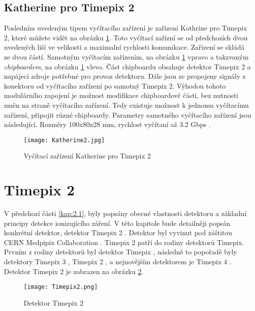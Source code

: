 \subsection{Katherine pro Timepix 2} %
Posledním uvedeným tipem vyčítacího zařízení je zařízení Kathrine pro Timepix 2, které můžete vidět na obrázku \ref{fig:Katherine2}. Toto vyčítací zařízní se od předchozích dvou uvedených liší ve velikosti a maximalní rychlosti komunikace. Zařízení se skládá ze dvou částí. Samotným vyčítacím zařízením, na obrázku \ref{fig:Katherine2} vpravo a takzvaným \textit{chipboardem}, na obrázku \ref{fig:Katherine2} vlevo. Část chipboardu obsahuje detektor Timepix 2 a napájecí zdroje potřebné pro provoz detektoru. Dále jsou ze propojeny signály z konektoru od vyčítacího zařízení po samotný Timepix 2. Výhodou tohoto modulárního zapojení je možnost modifikace chipboardové části, bez nutnosti změn na straně vyčítacího zařízení. Tedy existuje možnost k jednomu vyčítacímu zařízení, připojit různé chipboardy. Parametry samotného vyčítacího zařízení jsou následující. Rozměry 100x80x28 mm, rychlost vyčítaní až 3.2 Gbps \cite{Burian_2020}.
\begin{figure}[h!]
	\centering
	\captionsetup{justification=centering}
	\texttt{[image: Katherine2.jpg]}
	\caption{Vyčítací zařízení Katherine pro Timepix 2 \cite{Burian_2020}} 
	\label{fig:Katherine2}
\end{figure}	


\section{Timepix 2}
\label{Timepix2}
V předchozí části \ref{kap:2.1}, byly popsány obecné vlastnosti detektoru a základní principy detekce ionizujícího záření. V této kapitole bude detailněji popsán konkrétní detektor, detektor Timepix 2 \cite{tpx2_manual}. Detektor byl vyvinut pod záštitou CERN Medpipix Collaboration \cite{Medpix}. Timepix 2 patří do rodiny detektorů Timepix. Prvním z rodiny detektorů byl detektor Timepix \cite{Llopart}, následně to popořadě byly detektory Timepix 3 \cite{Timepix3}, Timepix 2 \cite{tpx2_manual}, \cite{Timepix2} a nejnovějším detektorem je Timepix 4 \cite{Timepix4}. Detektor Timepix 2 je zobrazen na obrázku \ref{fig:Timepix2}.
\begin{figure}[h!]
	\centering
	\captionsetup{justification=centering}
	\texttt{[image: Timepix2.png]}
	\caption{Detektor Timepix 2 \cite{Timepix2}} 
	\label{fig:Timepix2}
\end{figure}	

